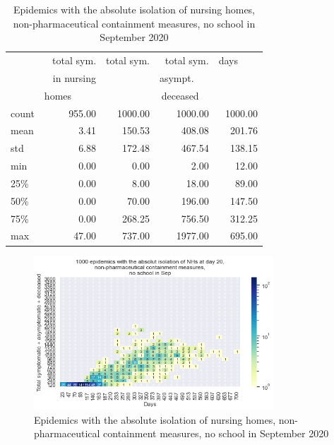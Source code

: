 \documentclass[11pt]{article}
\begin{document}
\begin{table}[H]
\center
\small
\begin{tabular}{lrrrr}
\toprule
{} & total sym.        &  total sym. & total sym.     & days~~~~ \\
{} & in nursing        &                  & asympt.~~~  & \\
{} & homes~~~~~  &                  & deceased~~ & \\
\midrule
count &     955.00 &             1000.00 &                 1000.00 & 1000.00 \\
mean  &       3.41 &              150.53 &                  408.08 &  201.76 \\
std   &       6.88 &              172.48 &                  467.54 &  138.15 \\
min   &       0.00 &                0.00 &                    2.00 &   12.00 \\
25\%   &       0.00 &                8.00 &                   18.00 &   89.00 \\
50\%   &       0.00 &               70.00 &                  196.00 &  147.50 \\
75\%   &       0.00 &              268.25 &                  756.50 &  312.25 \\
max   &      47.00 &              737.00 &                 1977.00 &  695.00 \\
\bottomrule
\end{tabular}

\label{EpidemicsNHsT}
\caption{Epidemics with the absolute isolation of nursing homes, non-pharmaceutical containment measures, no school in September 2020}
\end{table}


\begin{figure}[H]
\begin{center}
\includegraphics[width=0.8\textwidth]{HM30_readRunResults1k_with_NH_OP_BZ_at20_plusHMlog.png}
\caption{Epidemics with the absolute isolation of nursing homes, non-pharmaceutical containment measures, no school in September 2020}
\label{EpidemicsNHsHM}
\end{center}
\end{figure}
\end{document}
